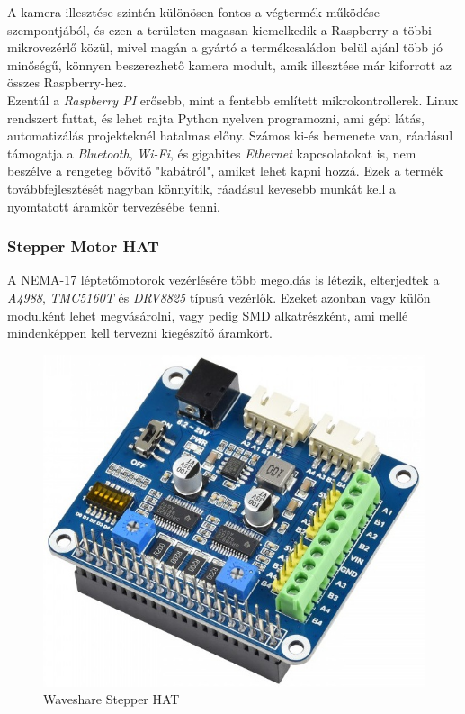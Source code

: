 \documentclass[12pt,a4paper]{article}
\begin{document}
A kamera illesztése szintén különösen fontos a végtermék működése szempontjából, és ezen a területen magasan kiemelkedik a Raspberry a többi mikrovezérlő közül, mivel magán a gyártó a termékcsaládon belül ajánl több jó minőségű, könnyen beszerezhető kamera modult, amik illesztése már kiforrott az összes Raspberry-hez.\\

Ezentúl a \textsl{Raspberry PI} erősebb, mint a fentebb említett mikrokontrollerek. Linux rendszert futtat, és lehet rajta Python nyelven programozni, ami gépi látás, automatizálás projekteknél hatalmas előny. Számos ki-és bemenete van, ráadásul támogatja a \textsl{Bluetooth}, \textsl{Wi-Fi}, és gigabites \textsl{Ethernet} kapcsolatokat is, nem beszélve a rengeteg bővítő "kabátról", amiket lehet kapni hozzá. Ezek a termék továbbfejlesztését nagyban könnyítik, ráadásul kevesebb munkát kell a nyomtatott áramkör tervezésébe tenni. \cite{raspberry4}

\subsubsection*{Stepper Motor HAT \cite{stepperhat}}
A NEMA-17 léptetőmotorok vezérlésére több megoldás is létezik, elterjedtek a \textsl{A4988}, \textsl{TMC5160T} és \textsl{DRV8825} típusú vezérlők. Ezeket azonban vagy külön modulként lehet megvásárolni, vagy pedig SMD alkatrészként, ami mellé mindenképpen kell tervezni kiegészítő áramkört. \\

\begin{figure}[h!]
	\centering
	\includegraphics[width=0.6\linewidth]{elek_stepperhat}
	\caption{Waveshare Stepper HAT \cite{stepperhat}}
	\label{fig:elek_stepperhat}
\end{figure}
\end{document}
